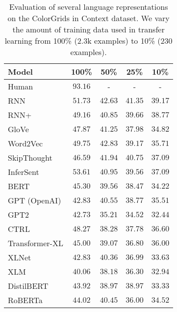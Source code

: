 \documentclass[11pt,a4paper]{article}
\begin{document}
\begin{table*}[t!]
\centering
\begin{tabular}{lcccc}
\hline
\textbf{Model} & \textbf{100\%} & \textbf{50\%} & \textbf{25\%} & \textbf{10\%} \\
\hline
Human & $93.16$ & - & - & - \\
\hline
RNN & $51.73$ & $\mathbf{42.63}$ & $\mathbf{41.35}$ & $\mathbf{39.17}$ \\
RNN+ & $49.16$ & $40.85$ & $39.66$ & $38.77$ \\
GloVe & $47.87$ & $41.25$ & $37.98$ & $34.82$ \\
Word2Vec & $49.75$ & $42.83$ & $39.17$ & $35.71$ \\
SkipThought & $46.59$ & $41.94$ & $40.75$ & $37.09$\\
InferSent & $\mathbf{53.61}$ & $40.95$ & $39.56$ & $37.09$ \\
BERT & $45.30$ & $39.56$ & $38.47$ & $34.22$ \\
GPT (OpenAI) & $42.83$ & $40.55$ & $38.77$ & $35.51$ \\
GPT2 & $42.73$ & $35.21$ & $34.52$ & $32.44$ \\
CTRL & $48.27$ & $38.28$ & $37.78$ & $36.60$ \\
Transformer-XL & $45.00$ & $39.07$ & $36.80$ & $36.00$ \\
XLNet & $42.83$ & $40.36$ & $36.99$ & $33.63$ \\
XLM & $40.06$ & $38.18$ & $36.30$ & $32.94$ \\
DistilBERT & $43.92$ & $38.97$ & $38.97$ & $33.33$ \\
RoBERTa & $44.02$ & $40.45$ & $36.00$ & $34.52$ \\
\hline
\end{tabular}
\caption{\label{table:colors} Evaluation of several language representations on the ColorGrids in Context dataset. We vary the amount of training data used in transfer learning from 100\% (2.3k examples) to 10\% (230 examples).}
\end{table*}
\end{document}
